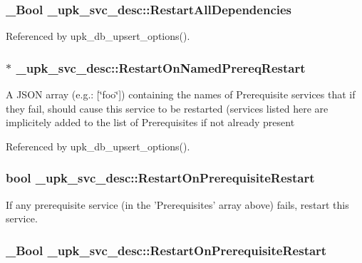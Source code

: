 \subsubsection[{RestartAllDependencies}]{\setlength{\rightskip}{0pt plus 5cm}\_\-Bool {\bf \_\-upk\_\-svc\_\-desc::RestartAllDependencies}}\label{struct__upk__svc__desc_aabc2349bcc6ff2a8da04dcd9d91a88c3}


Referenced by upk\_\-db\_\-upsert\_\-options().

\subsubsection[{RestartOnNamedPrereqRestart}]{ $\ast$ {\bf \_\-upk\_\-svc\_\-desc::RestartOnNamedPrereqRestart}}\label{struct__upk__svc__desc_ad4daf67092063aa01aea982230ca281a}
A JSON array (e.g.: [\char`\"{}foo\char`\"{}]) containing the names of Prerequisite services that if they fail, should cause this service to be restarted (services listed here are implicitely added to the list of Prerequisites if not already present 

Referenced by upk\_\-db\_\-upsert\_\-options().

\subsubsection[{RestartOnPrerequisiteRestart}]{\setlength{\rightskip}{0pt plus 5cm}bool {\bf \_\-upk\_\-svc\_\-desc::RestartOnPrerequisiteRestart}}\label{struct__upk__svc__desc_a6a7cc3922b9344f4cd98b724dc5172d4}
If any prerequisite service (in the 'Prerequisites' array above) fails, restart this service. 
\subsubsection[{RestartOnPrerequisiteRestart}]{\setlength{\rightskip}{0pt plus 5cm}\_\-Bool {\bf \_\-upk\_\-svc\_\-desc::RestartOnPrerequisiteRestart}}\label{struct__upk__svc__desc_a553d46011a5fea45c19339d35286e61f}


